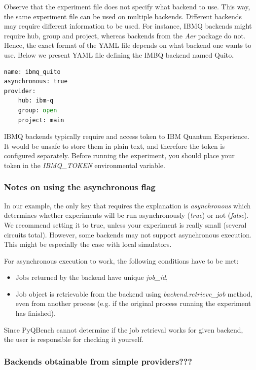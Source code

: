 \documentclass[preprint,12pt, a4paper, dvipsnames]{elsarticle}
\newcommand{\1}{{\rm 1\hspace{-0.9mm}l}}
\begin{document}
Observe that the experiment file does not specify what backend to use. This way, the same experiment file can be used on multiple backends.
 Different backends may require different information to be used. For instance, IBMQ backends might require hub, group and project, whereas backends from the \textit{Aer} package do not. Hence, the exact format of the YAML file depends on what backend one wants to use. Below we present 
 YAML file defining the IMBQ backend named Quito. 
\begin{lstlisting}[language=Python, caption=IBMQ backend]
name: ibmq_quito
asynchronous: true
provider:
	hub: ibm-q
	group: open
	project: main
\end{lstlisting}


IBMQ backends typically require and access token to IBM Quantum Experience. It would be unsafe to store them in plain text, and therefore the token is configured separately. Before running the experiment, you should place your token in the \textit{IBMQ\_TOKEN} environmental variable.

\subsubsection{Notes on using the asynchronous flag}
In our example, the only key that requires the explanation is \textit{asynchronous} which determines whether experiments will be run asynchronously  (\textit{true}) or not (\textit{false}).
 We recommend setting it to true, unless your experiment is really small (several circuits total). However, some backends may not support asynchronous execution. This might be especially the case with local simulators. 

For asynchronous execution to work, the following conditions have to be met:
\begin{itemize}
\item Jobs returned by the backend have unique \textit{job\_id}, 
\item Job object is retrievable from the backend using \textit{backend.retrieve\_job} method, even from another process (e.g. if the original process running the experiment has finished).
\end{itemize}
Since PyQBench cannot determine if the job retrieval works for given backend, the user is responsible for checking it yourself. 

\subsubsection{Backends obtainable from simple providers???}
\end{document}
